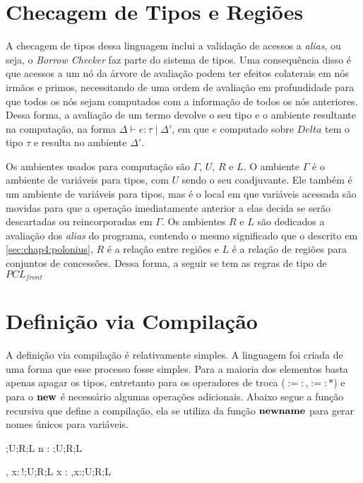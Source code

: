 \section{Checagem de Tipos e Regiões}

A checagem de tipos dessa linguagem inclui a validação de acessos a \emph{alias}, ou seja, o \emph{Borrow Checker} faz parte do sistema de tipos. Uma consequência disso é que acessos a um nó da árvore de avaliação podem ter efeitos colaterais em nós irmãos e primos, necessitando de uma ordem de avaliação em profundidade para que todos os nós sejam computados com a informação de todos os nós anteriores. Dessa forma, a avaliação de um termo devolve o seu tipo e o ambiente resultante na computação, na forma $\Delta \vdash e : \tau\;|\;\Delta'$, em que $e$ computado sobre $Delta$ tem o tipo $\tau$ e resulta no ambiente $\Delta'$.

Os ambientes usados para computação são $\Gamma$, $U$, $R$ e $L$. O ambiente $\Gamma$ é o ambiente de variáveis para tipos, com $U$ sendo o seu coadjuvante. Ele também é um ambiente de variáveis para tipos, mas é o local em que variáveis acessada são movidas para que a operação imediatamente anterior a elas decida se serão descartadas ou reincorporadas em $\Gamma$. Os ambientes $R$ e $L$ são dedicados a avaliação dos \emph{alias} do programa, contendo o mesmo significado que o descrito em \ref{sec:chap4:polonius}, $R$ é a relação entre regiões e $L$ é a relação de regiões para conjuntos de concessões. Dessa forma, a seguir se tem as regras de tipo de $PCL_{front}$




\section{Definição via Compilação}

A definição via compilação é relativamente simples. A linguagem foi criada de uma forma que esse processo fosse simples. Para a maioria dos elementos basta apenas apagar os tipos, entretanto para os operadores de troca ($:=:$,$:=:\!\!\text{*}$) e para o $\mathbf{new}$ é necessário algumas operações adicionais. Abaixo segue a função recursiva que define a compilação, ela se utiliza da função $\mathbf{newname}$ para gerar nomes únicos para variáveis.

\infrule[Number]
	{}
	{\Gamma;U;R;L \vdash n :  \OR \Gamma;U;R;L} 

	{\Gamma, x:\,!\tau;U;R;L \vdash x : \tau \OR \Gamma,x:\tau;U;R;L} 


